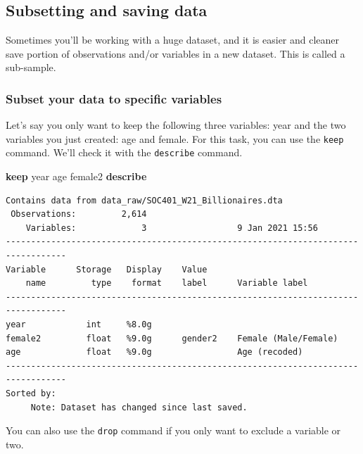 \documentclass[
]{book}
\newenvironment{Shaded}{\begin{snugshade}}{\end{snugshade}}
\newcommand{\FunctionTok}[1]{\textcolor[rgb]{0.00,0.00,0.00}{#1}}
\newcommand{\KeywordTok}[1]{\textcolor[rgb]{0.13,0.29,0.53}{\textbf{#1}}}
\newcommand{\NormalTok}[1]{#1}
\begin{document}
\hypertarget{subsetting-and-saving-data}{%
\subsection*{Subsetting and saving data}\label{subsetting-and-saving-data}}

Sometimes you'll be working with a huge dataset, and it is easier and cleaner save portion of observations and/or variables in a new dataset. This is called a sub-sample.

\hypertarget{keep}{%
\subsubsection*{Subset your data to specific variables}\label{keep}}

Let's say you only want to keep the following three variables: year and the two variables you just created: age and female. For this task, you can use the \texttt{keep} command. We'll check it with the \texttt{describe} command.

\begin{Shaded}
\begin{Highlighting}[]
\KeywordTok{keep} \FunctionTok{year}\NormalTok{ age female2}
\KeywordTok{describe}
\end{Highlighting}
\end{Shaded}

\begin{verbatim}
Contains data from data_raw/SOC401_W21_Billionaires.dta
 Observations:         2,614                  
    Variables:             3                  9 Jan 2021 15:56
----------------------------------------------------------------------------------
Variable      Storage   Display    Value
    name         type    format    label      Variable label
----------------------------------------------------------------------------------
year            int     %8.0g                 
female2         float   %9.0g      gender2    Female (Male/Female)
age             float   %9.0g                 Age (recoded)
----------------------------------------------------------------------------------
Sorted by: 
     Note: Dataset has changed since last saved.
\end{verbatim}

You can also use the \texttt{drop} command if you only want to exclude a variable or two.
\end{document}
